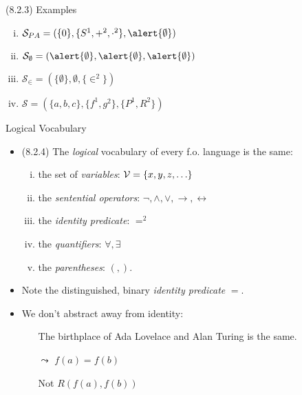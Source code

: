 \begin{frame}{(8.2.3) Examples}

	\begin{enumerate}[(i)]
			
				\item $\mathcal{S}_{PA}=(\{0\}, \{S^1, +^2, \cdot^2\}, \alert{\emptyset})$ 
				
				\item $\mathcal{S}_\emptyset=(\alert{\emptyset},\alert{\emptyset},\alert{\emptyset})$
				
				\item $\mathcal{S}_\in=(\{\emptyset\}, \emptyset, \{\in^2\})$
			
			
				\item$\mathcal{S}=(\{a,b,c\}, \{f^1, g^2\}, \{P^1, R^2\})$			
			\end{enumerate}	

\end{frame}

\begin{frame}{Logical Vocabulary}

	\begin{itemize}
	
		\item (8.2.4) The \emph{logical} vocabulary of every f.o. language is the same:
		\begin{enumerate}[(i)]
		
			\item the set of \emph{variables}: $\mathcal{V}=\{x,y,z,\mathellipsis\}$
			
			\item the \emph{sentential operators}: $\neg,\land,\lor,\to,\leftrightarrow$
			
			\item the \emph{identity predicate}: \alert{$=^2$}
			
			\item the \emph{quantifiers}: $\forall,\exists$
			
			\item the \emph{parentheses}: $(,)$.
		
		\end{enumerate}

		\item Note the distinguished, binary \emph{identity predicate} $=$.
		
		\item We don't abstract away from identity:
		
			\begin{itemize}
			
				\item[] The birthplace of Ada Lovelace and Alan Turing is the same.
				
				\item[$\leadsto$] $f(a)=f(b)$
				
				\item[\alert{Not}] $R(f(a),f(b))$
			
			\end{itemize}
	
	\end{itemize}

\end{frame}


